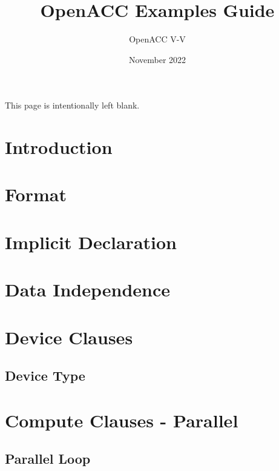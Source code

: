 \documentclass{article}
\begin{document}
\title{OpenACC Examples Guide}

\author{OpenACC V-V}
\date{November 2022}

\maketitle
\newpage

This page is intentionally left blank.

\newpage
\tableofcontents
{}

\newpage
{}
\section*{Introduction}


\newpage
{}
\section*{Format}


\newpage
\section{Implicit Declaration}


\newpage
\section{Data Independence}


\newpage
\section{Device Clauses}


\subsection{Device Type}


\newpage
\section{Compute Clauses - Parallel}


\subsection{Parallel Loop}

\end{document}
